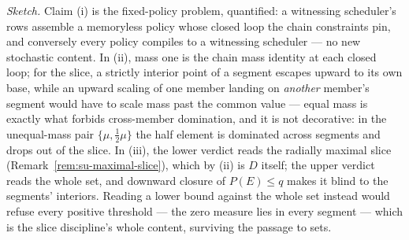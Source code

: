 \emph{Sketch.} Claim (i) is the fixed-policy problem, quantified: a
witnessing scheduler's rows assemble a memoryless policy whose closed
loop the chain constraints pin, and conversely every policy compiles
to a witnessing scheduler --- no new stochastic content.  In (ii),
mass one is the chain mass identity at each closed loop; for the
slice, a strictly interior point of a segment escapes upward to its
own base, while an upward scaling of one member landing on
\emph{another} member's segment would have to scale mass past the
common value --- equal mass is exactly what forbids cross-member
domination, and it is not decorative: in the unequal-mass pair
$\{\mu, \tfrac{1}{2}\mu\}$ the half element is dominated across
segments and drops out of the slice.  In (iii), the lower verdict
reads the radially maximal slice
(Remark~\ref{rem:su-maximal-slice}), which by (ii) is $D$ itself;
the upper verdict reads the whole set, and downward closure of
$P(E) \le q$ makes it blind to the segments' interiors.  Reading a
lower bound against the whole set instead would refuse every positive
threshold --- the zero measure lies in every segment --- which is the
slice discipline's whole content, surviving the passage to sets.

